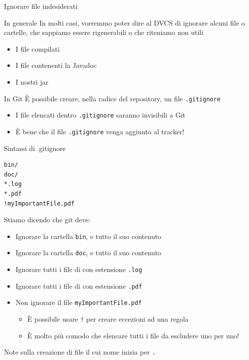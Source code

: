 \documentclass[presentation]{beamer}
\begin{document}
\begin{frame}{Ignorare file indesiderati}
	\begin{block}{In generale}
		In molti casi, vorremmo poter dire al DVCS di ignorare alcuni file o cartelle, che sappiamo essere rigenerabili o che riteniamo non utili
		\begin{itemize}
			\item I file compilati
			\item I file contenenti la Javadoc
			\item I nostri jar
		\end{itemize}
	\end{block}
	\begin{block}{In Git}
		È possibile creare, nella radice del repository, un file \texttt{.gitignore}
		\begin{itemize}
			\item I file elencati dentro \texttt{.gitignore} saranno invisibili a Git
			\item È bene che il file \texttt{.gitignore} venga aggiunto al tracker!
		\end{itemize}
	\end{block}
	\begin{block}{Sintassi di .gitignore}
		\begin{Verbatim}[fontsize=\scriptsize]
bin/
doc/
*.log
*.pdf
!myImportantFile.pdf
		\end{Verbatim}
		Stiamo dicendo che git deve:
		\begin{itemize}
			\item Ignorare la cartella \texttt{bin}, e tutto il suo contenuto
			\item Ignorare la cartella \texttt{doc}, e tutto il suo contenuto
			\item Ignorare tutti i file di con estensione \texttt{.log}
			\item Ignorare tutti i file di con estensione \texttt{.pdf}
			\item Non ignorare il file \texttt{myImportantFile.pdf}
			\begin{itemize}
				\item È possibile usare \texttt{!} per creare eccezioni ad una regola
				\item È molto più comodo che elencare tutti i file da escludere uno per uno!
			\end{itemize}
		\end{itemize}
	\end{block}
	\begin{block}{Note sulla creazione di file il cui nome inizia per \texttt{.}}

\end{block}
\end{frame}
\end{document}
